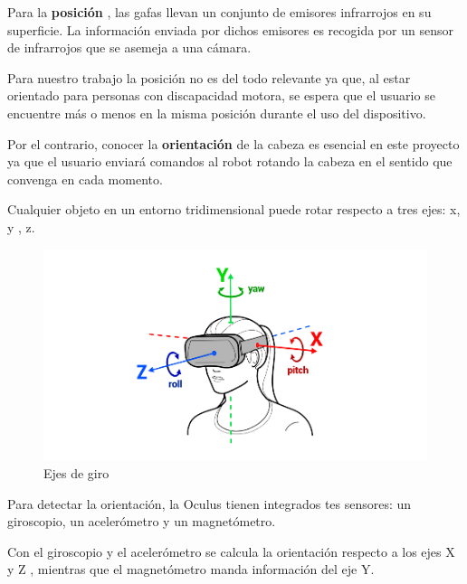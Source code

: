 \documentclass[twoside, 11pt]{epstfg}
\begin{document}
Para la \textbf{posición} , las gafas llevan un conjunto de emisores infrarrojos en su superficie. La información enviada por dichos emisores es recogida por un sensor de infrarrojos que se asemeja a una cámara.

Para nuestro trabajo la posición no es del todo relevante ya que, al estar orientado para personas con discapacidad motora,  se espera que el usuario se encuentre más o menos en la misma posición durante el uso del dispositivo.

Por el contrario, conocer la \textbf{orientación} de la cabeza es esencial en este proyecto ya que el usuario enviará comandos al robot rotando la cabeza en el sentido que convenga en cada momento.

Cualquier objeto en un entorno tridimensional puede rotar respecto a  tres ejes: x, y , z.

\begin{figure}[H]
	\centerline{
		\mbox{\includegraphics[width=5.00in]{images/headTrack.png}}
	}
	\caption{Ejes de giro}
\end{figure}

Para detectar la orientación, la Oculus tienen integrados tes sensores: un giroscopio, un acelerómetro y un magnetómetro.

Con el giroscopio y el acelerómetro se calcula la orientación respecto a los ejes  X y Z , mientras que el magnetómetro manda información del eje Y.
\end{document}
